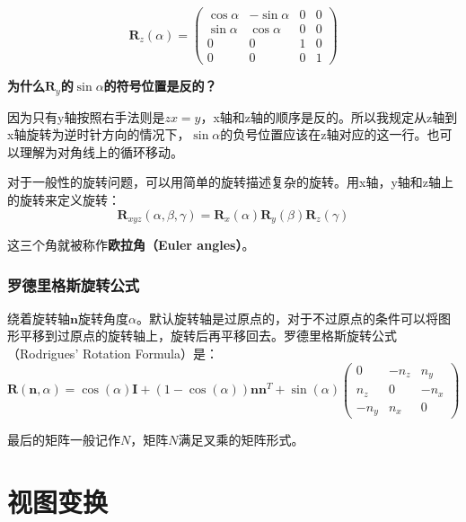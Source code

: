 \documentclass[openany]{progbookcn}
\begin{document}
\begin{equation}
	\textbf{R}_z(\alpha)=\begin{pmatrix}\cos\alpha&-\sin\alpha&0&0\\\sin\alpha&\cos\alpha&0&0\\0&0&1&0\\0&0&0&1\end{pmatrix}
\end{equation}

\begin{question}
	\textbf{为什么$\textbf{R}_y$的$\sin\alpha$的符号位置是反的？}
	
	因为只有y轴按照右手法则是$zx=y$，x轴和z轴的顺序是反的。所以我规定从z轴到x轴旋转为逆时针方向的情况下，$\sin\alpha$的负号位置应该在z轴对应的这一行。也可以理解为对角线上的循环移动。
\end{question}

对于一般性的旋转问题，可以用简单的旋转描述复杂的旋转。用x轴，y轴和z轴上的旋转来定义旋转：
\begin{equation}
	\textbf{R}_{xyz}(\alpha,\beta,\gamma)=\textbf{R}_x(\alpha)\textbf{R}_y(\beta)\textbf{R}_z(\gamma)
\end{equation}

这三个角就被称作\textbf{欧拉角（Euler angles）}。

\subsubsection{罗德里格斯旋转公式}

绕着旋转轴$\textbf{n}$旋转角度$\alpha$。默认旋转轴是过原点的，对于不过原点的条件可以将图形平移到过原点的旋转轴上，旋转后再平移回去。罗德里格斯旋转公式（Rodrigues' Rotation Formula）是：
\begin{equation}
	\textbf{R}(\textbf{n},\alpha)=\cos(\alpha)\textbf{I}+(1-\cos(\alpha))\textbf{n}\textbf{n}^T+\sin(\alpha)\begin{pmatrix}0&-n_z&n_y\\n_z&0&-n_x\\-n_y&n_x&0\end{pmatrix}
\end{equation}

最后的矩阵一般记作$N$，矩阵$N$满足叉乘的矩阵形式。

%	
%	

\section{视图变换}
\end{document}
